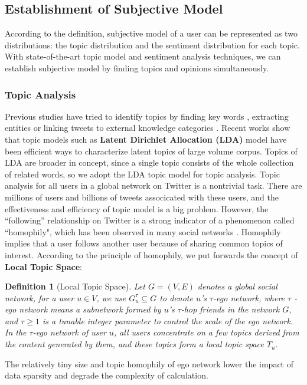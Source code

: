 \documentclass[letterpaper]{article}
\newtheorem{definition}{Definition}
\begin{document}
\subsection{Establishment of Subjective Model}
\label{establishment}
According to the definition, subjective model of a user can be represented as two distributions: the topic distribution and the sentiment distribution for each topic. 
With state-of-the-art topic model and sentiment analysis techniques, we can establish subjective model by finding topics and opinions simultaneously. 
\subsubsection{Topic Analysis}
\label{topic}
Previous studies have tried to identify topics by finding key words \cite{Chen:2010STE}, extracting  entities \cite{Abel:2011AUM} or linking tweets to external knowledge categories \cite{conf/icwsm/MacskassyM11}. Recent works show that topic models such as \textbf{Latent Dirichlet Allocation (LDA)} model \cite{blei2003latent} have been efficient ways to characterize latent topics of large volume corpus.  
Topics of LDA are broader in concept, since a single topic consists of the whole collection of related words, so we adopt the LDA topic model for topic analysis.  
Topic analysis for all users in a global network on Twitter is a nontrivial task. 
There are millions of users and billions of tweets associcated with these users, and the effectiveness and efficiency of topic model is a big problem.
However, the ``following'' relationship on Twitter is a strong indicator of a phenomenon called ``homophily", which has been observed in many social networks \cite{mcpherson2001birds}.
Homophily implies that a user follows another user because of sharing common topics of interest. 
According to the principle of homophily, we put forwards the concept of \textbf{Local Topic Space}: 
\begin{definition}[Local Topic Space]
\label{local}
Let $G=\left( V,E \right) $ denotes a global social network, for a user $ u \in V $, we use $ G_{u}^{\tau} \subseteq G$ 
to denote $ u $'s $ \tau $-ego network, where $ \tau $ -ego network means a subnetwork formed by $ u $'s $ \tau $-hop 
friends in the network $ G $, and $ \tau \geqslant 1 $ is a tunable integer parameter to control the scale of the ego network. 
In the $ \tau $-ego network of user $ u $, all users concentrate on a few topics derived from the content generated by them, and these topics form a local topic space $ T_{u} $.
\end{definition}
The relatively tiny size and topic homophily of ego network lower the impact of data sparsity and degrade the complexity of calculation.
\end{document}
